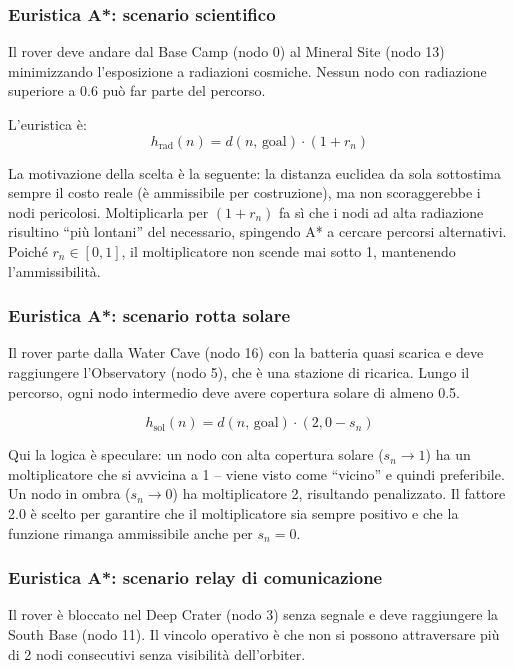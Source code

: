 \documentclass[11pt,a4paper]{article}
\begin{document}
\subsubsection{Euristica A*: scenario scientifico}
Il rover deve andare dal Base Camp (nodo 0) al Mineral Site (nodo 13) minimizzando l'esposizione a radiazioni cosmiche. Nessun nodo con radiazione superiore a 0.6 può far parte del percorso.

L'euristica è:
\[
  h_{\text{rad}}(n) = d(n,\,\text{goal}) \cdot (1 + r_n)
\]

La motivazione della scelta è la seguente: la distanza euclidea da sola sottostima sempre il costo reale (è ammissibile per costruzione), ma non scoraggerebbe i nodi pericolosi. Moltiplicarla per $(1 + r_n)$ fa sì che i nodi ad alta radiazione risultino ``più lontani'' del necessario, spingendo A* a cercare percorsi alternativi. Poiché $r_n \in [0,1]$, il moltiplicatore non scende mai sotto 1, mantenendo l'ammissibilità.

\subsubsection{Euristica A*: scenario rotta solare}

Il rover parte dalla Water Cave (nodo 16) con la batteria quasi scarica e deve raggiungere l'Observatory (nodo 5), che è una stazione di ricarica. Lungo il percorso, ogni nodo intermedio deve avere copertura solare di almeno 0.5.

\[
  h_{\text{sol}}(n) = d(n,\,\text{goal}) \cdot (2{,}0 - s_n)
\]

Qui la logica è speculare: un nodo con alta copertura solare ($s_n \to 1$) ha un moltiplicatore che si avvicina a 1 -- viene visto come ``vicino'' e quindi preferibile. Un nodo in ombra ($s_n \to 0$) ha moltiplicatore 2, risultando penalizzato. Il fattore 2.0 è scelto per garantire che il moltiplicatore sia sempre positivo e che la funzione rimanga ammissibile anche per $s_n = 0$.

\subsubsection{Euristica A*: scenario relay di comunicazione}

Il rover è bloccato nel Deep Crater (nodo 3) senza segnale e deve raggiungere la South Base (nodo 11). Il vincolo operativo è che non si possono attraversare più di 2 nodi consecutivi senza visibilità dell'orbiter.
\end{document}
